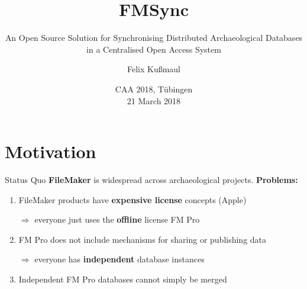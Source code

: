 \documentclass[xcolor=x11names, aspectratio=169,usenames,dvipsnames]{beamer}
\author[Felix Kußmaul]{\large Felix Kußmaul\inst{1}}
\title[FMSync]{\Large FMSync}
\subtitle{\normalsize An Open Source Solution for Synchronising Distributed Archaeological Databases in a Centralised Open Access System}
\institute[Cologne]{\inst{1} Archaeological Institute, University of Cologne}
\date[\today]{\vspace*{1em}CAA 2018, Tübingen\\[.5em] 21 March 2018\vspace*{1em}}
\begin{document}
\begin{frame}[plain]
\titlepage
\end{frame}

\section{Motivation}

\begin{frame}{Status Quo}\large
\textbf{FileMaker} is widespread across archaeological projects. \alert{\textbf{Problems:}}
\begin{spacing}{1.5}
\begin{enumerate}[<+->]
\item FileMaker products have \textbf{expensive license} concepts (Apple)

$\Rightarrow$ everyone just uses the \textbf{offline} license FM Pro
\item FM Pro does not include mechanisms for sharing or publishing data

$\Rightarrow$ everyone has \textbf{independent} database instances
\item Independent FM Pro databases cannot simply be merged
\end{enumerate}
\end{spacing}
\end{frame}
\end{document}
